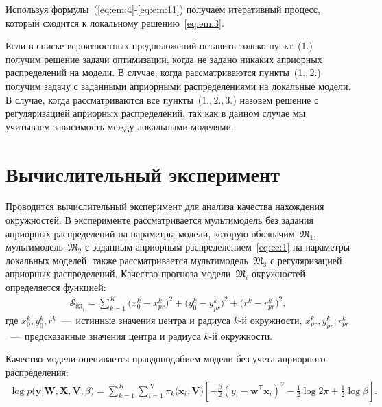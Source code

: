 \documentclass[12pt, twoside]{article}
\numberwithin{equation}{section}
\begin{document}
Используя формулы~(\ref{eq:em:4}-\ref{eq:em:11}) получаем итеративный процесс, который сходится к локальному решению~\eqref{eq:em:3}.

Если в списке вероятностных предположений оставить только пункт~(1.) получим решение задачи оптимизации, когда не задано никаких априорных распределений на модели. В случае, когда рассматриваются пункты~(1.,\,2.) получим задачу с заданными априорными распределениями на локальные модели.  В случае, когда рассматриваются все пункты~(1.,\,2.,\,3.) назовем решение с регуляризацией априорных распределений, так как в данном случае мы учитываем зависимость между локальными моделями.

\section{Вычислительный эксперимент}
Проводится вычислительный эксперимент для анализа качества нахождения окружностей. В эксперименте рассматривается мультимодель без задания априорных распределений на параметры модели, которую обозначим~$\mathfrak{M}_1$, мультимодель~$\mathfrak{M}_2$ с заданным априорным распределением~\eqref{eq:ce:1} на параметры локальных моделей, также рассматривается мультимодель~$\mathfrak{M}_3$ с регуляризацией априорных распределений.
Качество прогноза модели~$\mathfrak{M}_i$ окружностей определяется функцией:
\begin{equation}
\label{eq:ce:ex:0:1}
\begin{aligned}
\mathcal{S}_{\mathfrak{M}_i} = \sum_{k=1}^{K}\bigr(x^{k}_{0}-x^{k}_{pr}\bigr)^2+\bigr(y^{k}_{0}-y^{k}_{pr}\bigr)^2+\bigr(r^{k}-r^{k}_{pr}\bigr)^2,
\end{aligned}
\end{equation}
где $x^{k}_0, y^{k}_0, r^{k}$~---~истинные  значения центра и радиуса $k$-й окружности, $x^{k}_{pr}, y^{k}_{pr}, r^{k}_{pr}$~---~предсказанные значения центра и радиуса $k$-й окружности.

Качество модели оценивается правдоподобием модели без учета априорного распределения:
\begin{equation}
\label{eq:ce:st:2:1}
\begin{aligned}
\log p\bigr(\mathbf{y}|\mathbf{W}, \mathbf{X}, \mathbf{V}, \beta\bigr) = \sum_{k=1}^{K}\sum_{i=1}^{N}\pi_{k}\bigr(\mathbf{x}_i, \mathbf{V}\bigr)\left[-\frac{\beta}{2}\left(y_i-\mathbf{w}^{\mathsf{T}}\mathbf{x}_i\right)^2-\frac{1}{2}\log{2\pi}+\frac{1}{2}\log\beta\right].
\end{aligned}
\end{equation}
\end{document}
